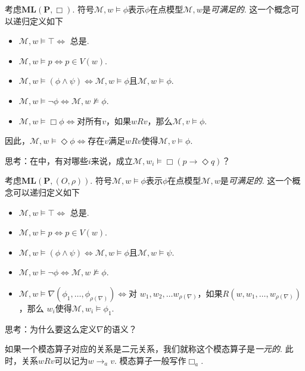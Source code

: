 \begin{definition}
    考虑$\mathbf{ML}(\mathbf{P},\Box)$. 符号$\mathcal M,w\vDash\phi$表示$\phi$在点模型$\mathcal M,w$是\emph{可满足的}. 这一个概念可以递归定义如下
    \begin{itemize}
        \item $\mathcal M, w\vDash\top\iff$ 总是.
        \item $\mathcal M, w\vDash p\iff p\in V(w)$.
        \item $\mathcal M, w\vDash (\phi\wedge\psi)\iff\mathcal M,w\vDash\phi$且$\mathcal M,w\vDash\phi$.
        \item $\mathcal M, w\vDash \neg\phi\iff\mathcal M,w\not\vDash\phi$.
        \item $\mathcal M, w\vDash \Box\phi\iff$对所有$v$，如果$wRv$，那么$\mathcal M,v\vDash\phi$.
    \end{itemize}
    因此，$\mathcal M, w\vDash \Diamond\phi\iff$存在$v$满足$wRv$使得$\mathcal M,v\vDash\phi$.
\end{definition}

思考：在中，有对哪些$i$来说，成立$\mathcal M,w_i\vDash\Box (p\to\Diamond q)$？


\begin{definition}
    考虑$\mathbf{ML}(\mathbf{P},(O,\rho))$. 符号$\mathcal M,w\vDash\phi$表示$\phi$在点模型$\mathcal M,w$是\emph{可满足的}. 这一个概念可以递归定义如下
    \begin{itemize}
        \item $\mathcal M, w\vDash\top\iff$ 总是.
        \item $\mathcal M, w\vDash p\iff p\in V(w)$.
        \item $\mathcal M, w\vDash (\phi\wedge\psi)\iff\mathcal M,w\vDash\phi$且$\mathcal M,w\vDash\psi$.
        \item $\mathcal M, w\vDash \neg\phi\iff\mathcal M,w\not\vDash\phi$.
        \item $\mathcal M, w\vDash \nabla(\phi_1,\dots,\phi_{\rho(\nabla)})\iff$对 $w_1,w_2,\dots w_{\rho(\nabla)}$，如果$R(w,w_1,\dots,w_{\rho(\nabla)})$，那么 $w_i$使得$\mathcal M,w_i\vDash\phi_1$.
    \end{itemize}
\end{definition}

思考：为什么要这么定义$\nabla$的语义？

如果一个模态算子对应的关系是二元关系，我们就称这个模态算子是\emph{一元的}. 此时，关系$wRv$可以记为$w\to_a v$. 模态算子一般写作$\Box_a$.


